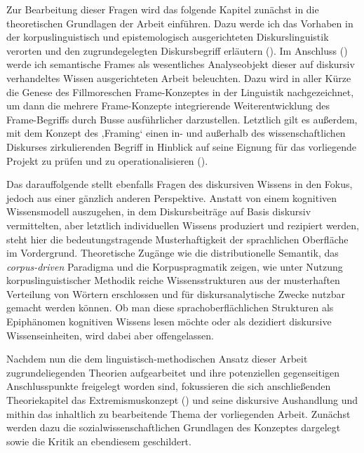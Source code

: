 Zur Bearbeitung dieser Fragen wird das folgende Kapitel zunächst in die theoretischen Grundlagen der Arbeit einführen. Dazu werde ich das Vorhaben in der korpuslinguistisch und epistemologisch ausgerichteten Diskurslinguistik verorten und den zugrundegelegten Diskursbegriff erläutern (). Im Anschluss () werde ich semantische Frames als wesentliches Analyseobjekt dieser auf diskursiv verhandeltes Wissen ausgerichteten Arbeit beleuchten. Dazu wird in aller Kürze die Genese des Fillmoreschen Frame-Konzeptes in der Linguistik nachgezeichnet, um dann die mehrere Frame-Konzepte integrierende Weiterentwicklung des Frame-Begriffs durch Busse \autocite*{busseFrameSemantikKompendium2012} ausführlicher darzustellen. Letztlich gilt es außerdem, mit dem Konzept des ‚Framing` einen in- und außerhalb des wissenschaftlichen Diskurses zirkulierenden Begriff in Hinblick auf seine Eignung für das vorliegende Projekt zu prüfen und zu operationalisieren ().

Das darauffolgende  stellt ebenfalls Fragen des diskursiven Wissens in den Fokus, jedoch aus einer gänzlich anderen Perspektive. Anstatt von einem kognitiven Wissensmodell auszugehen, in dem Diskursbeiträge auf Basis diskursiv vermittelten, aber letztlich individuellen Wissens produziert und rezipiert werden, steht hier die bedeutungstragende Musterhaftigkeit der sprachlichen Oberfläche im Vordergrund. Theoretische Zugänge wie die distributionelle Semantik, das \emph{corpus-driven} Paradigma und die Korpuspragmatik zeigen, wie unter Nutzung korpuslinguistischer Methodik reiche Wissensstrukturen aus der musterhaften Verteilung von Wörtern erschlossen und für diskursanalytische Zwecke nutzbar gemacht werden können. Ob man diese sprachoberflächlichen Strukturen als Epiphänomen kognitiven Wissens lesen möchte oder als dezidiert diskursive Wissenseinheiten, wird dabei aber offengelassen.

Nachdem nun die dem linguistisch-methodischen Ansatz dieser Arbeit zugrundeliegenden Theorien aufgearbeitet und ihre potenziellen gegenseitigen Anschlusspunkte freigelegt worden sind, fokussieren die sich anschließenden Theoriekapitel das Extremismuskonzept () und seine diskursive Aushandlung und mithin das inhaltlich zu bearbeitende Thema der vorliegenden Arbeit. Zunächst werden dazu die sozialwissenschaftlichen Grundlagen des Konzeptes dargelegt sowie die Kritik an ebendiesem geschildert.

